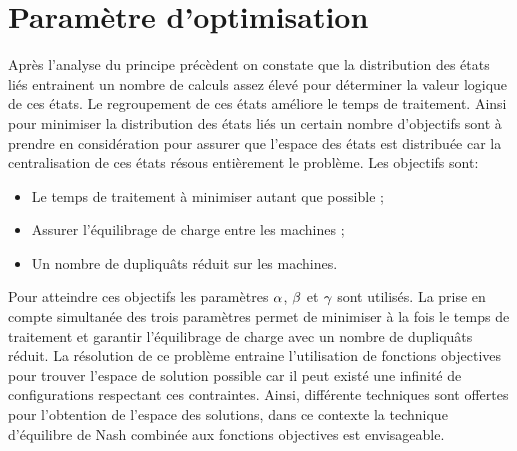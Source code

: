 
\section{Param\`{e}tre d’optimisation}
 
Apr\`{e}s l'analyse du principe pr\'{e}c\`{e}dent on constate que la distribution des \'{e}tats li\'{e}s entrainent un nombre de calculs assez élevé pour déterminer la valeur logique de ces états. Le regroupement de ces états am\'{e}liore le temps de traitement. Ainsi pour minimiser la distribution des \'{e}tats li\'{e}s un certain nombre d'objectifs sont à prendre en consid\'{e}ration pour assurer  que l'espace des \'{e}tats est distribuée car la centralisation de ces états résous entièrement le probl\`{e}me. Les objectifs sont:

\begin{itemize}[leftmargin=*,labelindent=1em]
	\item Le temps de traitement à minimiser autant que possible ;
	\item Assurer l’\'{e}quilibrage de charge entre les machines ;
	\item Un nombre de dupliquâts réduit sur les machines.
\end{itemize}

Pour atteindre ces objectifs les paramètres $\alpha{}$, $\beta{}$ et $\gamma{}$ sont utilisés. La prise en compte simultanée des trois param\`{e}tres permet de minimiser à la fois le temps de traitement et garantir l’\'{e}quilibrage de charge avec un nombre de dupliquâts réduit. La r\'{e}solution de ce problème entraine l'utilisation de fonctions objectives pour trouver l'espace de solution possible car il peut existé une infinit\'{e} de configurations respectant ces contraintes. Ainsi, diff\'{e}rente techniques sont offertes pour l'obtention de l'espace des solutions, dans ce contexte la technique d’\'{e}quilibre de Nash combin\'{e}e aux fonctions objectives est envisageable.
